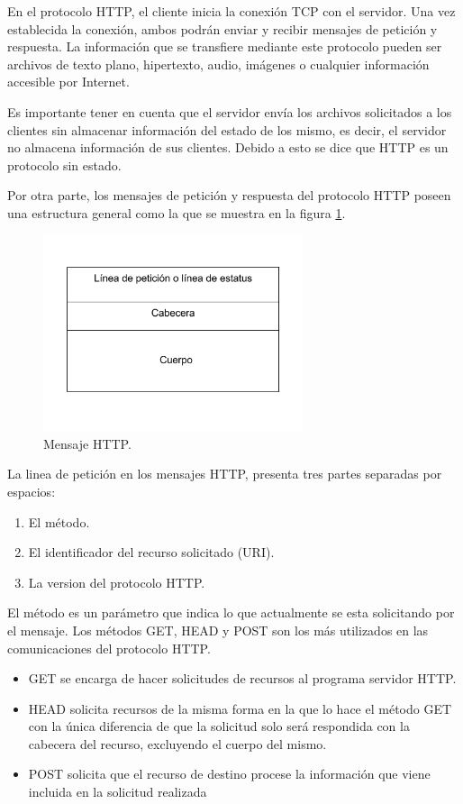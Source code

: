 En el protocolo HTTP, el cliente inicia la conexión TCP con el servidor. Una vez establecida la conexión, ambos podrán enviar y recibir mensajes de petición y respuesta. La información que se transfiere mediante este protocolo pueden ser archivos de texto plano, hipertexto, audio, imágenes o cualquier información accesible por Internet.

Es importante tener en cuenta que el servidor envía los archivos solicitados a los clientes sin almacenar información del estado de los mismo, es decir, el servidor no almacena información de sus clientes. Debido a esto se dice que HTTP es un protocolo sin estado.\cite{httpKross}

Por otra parte, los mensajes de petición y respuesta del protocolo HTTP poseen una estructura general como la que se muestra en la figura \ref{fig:httpMensaje}.

\begin{figure}[tb]
\begin{center}
\includegraphics[width=3in]{./img/mensajeHTTP.png}
\caption{Mensaje HTTP.\cite{httpKross}}
\label{fig:httpMensaje}
\end{center}
\end{figure}

La linea de petición en los mensajes HTTP, presenta tres partes separadas por espacios:

\begin{enumerate}
\item El método.
\item El identificador del recurso solicitado (URI).
\item La version del protocolo HTTP.
\end{enumerate}

El método es un parámetro que indica lo que actualmente se esta solicitando por el mensaje. 
Los m\'etodos GET, HEAD y POST son los más utilizados en las comunicaciones del protocolo HTTP. 

\begin{itemize}
\item GET se encarga de hacer solicitudes de recursos al programa servidor HTTP.
\item HEAD solicita recursos de la misma forma en la que lo hace el método GET con la \'unica diferencia de que la solicitud solo ser\'a respondida con la cabecera del recurso, excluyendo el cuerpo del mismo.
\item POST solicita que el recurso de destino  procese la informaci\'on que viene incluida en la solicitud realizada
\end{itemize}

